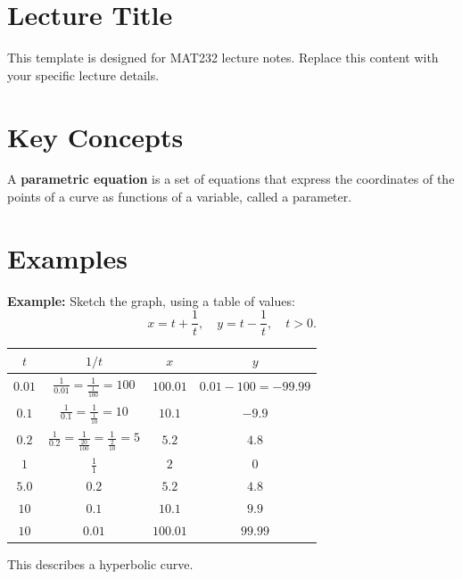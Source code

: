 \documentclass{article}
\begin{document}
\renewcommand{\familydefault}{\rmdefault}


\pagebreak
\normalsize

\section*{Lecture Title}
\begin{notebox}
This template is designed for MAT232 lecture notes. Replace this content with your specific lecture details.
\end{notebox}

\section*{Key Concepts}
\begin{definitionbox}
A \textbf{parametric equation} is a set of equations that express the coordinates of the points of a curve as functions of a variable, called a parameter.
\end{definitionbox}

\section*{Examples}
\begin{examplebox}
\textbf{Example:} Sketch the graph, using a table of values:
\[ x = t + \frac{1}{t}, \quad y = t - \frac{1}{t}, \quad t > 0. \]

\begin{center}
\begin{adjustbox}{max width=\textwidth}
\LARGE
\begin{tabular}{|c|c|c|c|}
\hline
$t$    & $1/t$ & $x$ & $y$ \\ \hline
$0.01$ & $\frac{1}{0.01} = \frac{1}{\frac{1}{100}} = 100$     & $100.01$   & $0.01 - 100 = -99.99$   \\ \hline
$0.1$  & $\frac{1}{0.1} = \frac{1}{\frac{1}{10}} = 10$     & $10.1$   & $-9.9$   \\ \hline
$0.2$  & $\frac{1}{0.2} = \frac{1}{\frac{20}{100}} = \frac{1}{\frac{2}{10}} = 5$     & $5.2$   & $4.8$   \\ \hline
$1$    & $\frac{1}{1}$     & $2$   & $0$   \\ \hline
$5.0$  & $0.2$     & $5.2$   & $4.8$   \\ \hline
$10$   & $0.1$     & $10.1$   & $9.9$   \\ \hline
$10$   & $0.01$    & $100.01$   & $99.99$   \\ \hline
\end{tabular}
\normalsize
\end{adjustbox}
\end{center}

This describes a hyperbolic curve.
\end{examplebox}
\end{document}
